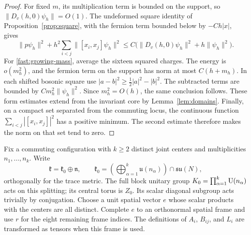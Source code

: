 \begin{proof}
For fixed $m$, its multiplication term is bounded on the support, so
$\|D_v(h,0)\psi_h\|=O(1)$. The undeformed square identity of
Proposition~\ref{prop:square}, with the fermion term bounded below by
$-Ch|x|$, gives
\[
 \|p\psi_h\|^2+h^2\sum_{i<j}\|[x_i,x_j]\psi_h\|^2
 \leq C\bigl(\|D_v(h,0)\psi_h\|^2+h\|\psi_h\|^2\bigr).
\]
For \eqref{fast:growing-mass}, average the sixteen squared charges. The
energy is $o(m_h^2)$, and the fermion term on the support has norm at most
$C(h+m_h)$. In each shifted bosonic square use
$|a-b|^2\geq\frac12|a|^2-|b|^2$. The subtracted terms are bounded by
$Cm_h^2\|\psi_h\|^2$. Since $m_h^2=O(h)$, the same conclusion follows.
These form estimates extend from the invariant core by
Lemma~\ref{lem:domains}. Finally, on a compact set separated from the
commuting locus, the continuous function
$\sum_{i<j}|[x_i,x_j]|^2$ has a positive minimum. The second estimate
therefore makes the norm on that set tend to zero.
\end{proof}

Fix a commuting configuration with $k\geq2$ distinct joint centers and
multiplicities $n_1,\ldots,n_k$. Write
\[
 \mathfrak k=\mathfrak k_0\oplus\mathfrak n,
 \qquad
 \mathfrak k_0=
 \left(\bigoplus_{\alpha=1}^k\mathfrak u(n_\alpha)\right)
 \cap\mathfrak{su}(N),
\]
orthogonally for the trace metric. The full block unitary group $K_0=\prod_{\alpha=1}^k\operatorname{U}(n_\alpha)$
acts on this splitting; its central torus is $Z_0$. Its scalar diagonal
subgroup acts trivially by conjugation.
Choose a unit spatial vector $e$ whose scalar products with the centers
are all distinct. Complete $e$ to an orthonormal spatial frame and use
$r$ for the eight remaining frame indices. The definitions of $A_i$,
$B_{ij}$, and $L_i$ are transformed as tensors when this frame is used.

